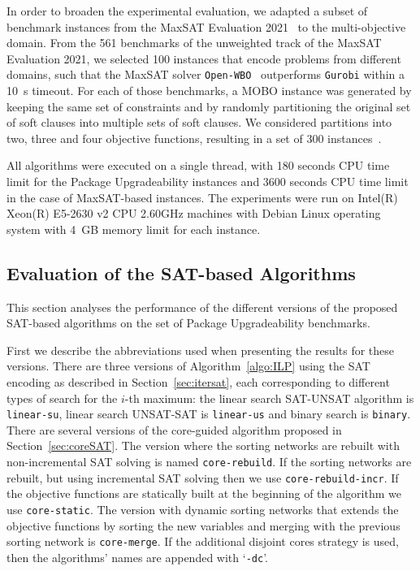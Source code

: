 \documentclass[a4paper,UKenglish,cleveref, autoref, thm-restate]{lipics-v2021}
\begin{document}
In order to broaden the experimental evaluation, we adapted a subset of benchmark instances from the MaxSAT Evaluation 2021~\cite{maxsat-eval-2021} to the multi-objective domain.
From the 561 benchmarks of the unweighted track of the MaxSAT Evaluation 2021, we selected 100 instances that encode problems from different domains, such that the MaxSAT solver \texttt{Open-WBO}~\cite{open-wbo, open-wbo-webpage} outperforms \texttt{Gurobi} within a 10~s timeout.
For each of those benchmarks, a MOBO instance was generated by keeping the same set of constraints and by randomly partitioning the original set of soft clauses into multiple sets of soft clauses.
We considered partitions into two, three and four objective functions, resulting in a set of 300 instances~\cite{mse21_pbmo_benchmarks}. 

All algorithms were executed on a single thread, with 180 seconds CPU time limit for the Package Upgradeability instances and 3600 seconds CPU time limit in the case of MaxSAT-based instances. 
The experiments were run on Intel(R) Xeon(R) E5-2630 v2 CPU 2.60GHz machines with Debian Linux operating system with 4~GB memory limit for each instance.

\subsection{Evaluation of the SAT-based Algorithms}

This section analyses the performance of the different versions of the proposed SAT-based algorithms on the set of Package Upgradeability benchmarks.

First we describe the abbreviations used when presenting the results for these versions.
There are three versions of Algorithm~\ref{algo:ILP} using the SAT encoding as described in Section~\ref{sec:itersat}, each corresponding to different types of search for the $i$-th maximum: the linear search SAT-UNSAT algorithm is \texttt{linear-su}, linear search UNSAT-SAT is \texttt{linear-us} and binary search is \texttt{binary}.
There are several versions of the core-guided algorithm proposed in Section~\ref{sec:coreSAT}.
The version where the sorting networks are rebuilt with non-incremental SAT solving is named \texttt{core-rebuild}. If the sorting networks are rebuilt, but using incremental SAT solving then we use \texttt{core-rebuild-incr}.
If the objective functions are statically built at the beginning of the algorithm we use \texttt{core-static}.
The version with dynamic sorting networks that extends the objective functions by sorting the new variables and merging with the previous sorting network is \texttt{core-merge}.
If the additional disjoint cores strategy is used, then the algorithms' names are appended with `\texttt{-dc}'.
\end{document}
